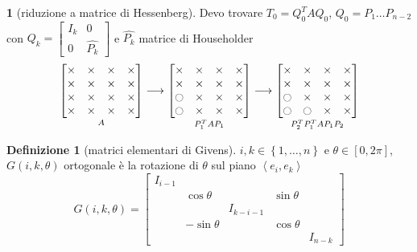 \documentclass[a4paper,10pt]{article}
\theoremstyle{definition}
\theoremstyle{indentdefinition}
\newtheorem{defn}{Definizione}[section]
\theoremstyle{indenttheorem}
\theoremstyle{myremark}
\theoremstyle{indentgeneral}
\newtheorem{lyxalgorithm}[thm]{\protect\algorithmname}
\theoremstyle{plain}
\theoremstyle{plain}
\begin{document}
\begin{lyxalgorithm}[riduzione a matrice di Hessenberg]
\label{alg:riduzione-matrice-Hessenberg}Devo trovare $T_{0}=Q_{0}^{T}AQ_{0}$,
$Q_{0}=P_{1}\ldots P_{n-2}$ con $Q_{k}=\begin{bmatrix}I_{k} & 0\\
0 & \widehat{P_{k}}
\end{bmatrix}$ e $\widehat{P_{k}}$ matrice di Householder
\[
\underset{A}{\begin{bmatrix}\times & \times & \times & \times\\
\times & \times & \times & \times\\
\times & \times & \times & \times\\
\times & \times & \times & \times
\end{bmatrix}}\longrightarrow\underset{P_{1}^{T}AP_{1}}{\begin{bmatrix}\times & \times & \times & \times\\
\times & \times & \times & \times\\
\ocircle & \times & \times & \times\\
\ocircle & \times & \times & \times
\end{bmatrix}}\longrightarrow\underset{P_{2}^{T}P_{1}^{T}AP_{1}P_{2}}{\begin{bmatrix}\times & \times & \times & \times\\
\times & \times & \times & \times\\
\ocircle & \times & \times & \times\\
\ocircle & \ocircle & \times & \times
\end{bmatrix}}
\]
\end{lyxalgorithm}

\begin{defn}[matrici elementari di Givens]
$i,k\in\left\{ 1,\ldots,n\right\} $ e $\theta\in\left[0,2\pi\right]$,
$G\left(i,k,\theta\right)$ ortogonale è la rotazione di $\theta$
sul piano $\left\langle e_{i},e_{k}\right\rangle $
\[
G\left(i,k,\theta\right)=\begin{bmatrix}I_{i-1}\\
 & \cos\theta &  & \sin\theta\\
 &  & I_{k-i-1}\\
 & -\sin\theta &  & \cos\theta\\
 &  &  &  & I_{n-k}
\end{bmatrix}
\]
\end{defn}
\end{document}
